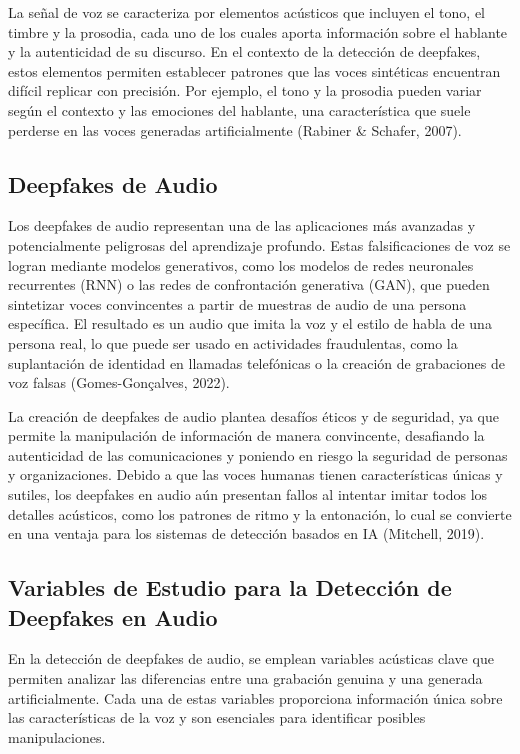 La señal de voz se caracteriza por elementos acústicos que incluyen el tono, el timbre y la prosodia, cada uno de los cuales aporta información sobre el hablante y la autenticidad de su discurso. En el contexto de la detección de deepfakes, estos elementos permiten establecer patrones que las voces sintéticas encuentran difícil replicar con precisión. Por ejemplo, el tono y la prosodia pueden variar según el contexto y las emociones del hablante, una característica que suele perderse en las voces generadas artificialmente (Rabiner \& Schafer, 2007).

\subsection{Deepfakes de Audio}

Los deepfakes de audio representan una de las aplicaciones más avanzadas y potencialmente peligrosas del aprendizaje profundo. Estas falsificaciones de voz se logran mediante modelos generativos, como los modelos de redes neuronales recurrentes (RNN) o las redes de confrontación generativa (GAN), que pueden sintetizar voces convincentes a partir de muestras de audio de una persona específica. El resultado es un audio que imita la voz y el estilo de habla de una persona real, lo que puede ser usado en actividades fraudulentas, como la suplantación de identidad en llamadas telefónicas o la creación de grabaciones de voz falsas (Gomes-Gonçalves, 2022).

La creación de deepfakes de audio plantea desafíos éticos y de seguridad, ya que permite la manipulación de información de manera convincente, desafiando la autenticidad de las comunicaciones y poniendo en riesgo la seguridad de personas y organizaciones. Debido a que las voces humanas tienen características únicas y sutiles, los deepfakes en audio aún presentan fallos al intentar imitar todos los detalles acústicos, como los patrones de ritmo y la entonación, lo cual se convierte en una ventaja para los sistemas de detección basados en IA (Mitchell, 2019).

\subsection{Variables de Estudio para la Detección de Deepfakes en Audio}
En la detección de deepfakes de audio, se emplean variables acústicas clave que permiten analizar las diferencias entre una grabación genuina y una generada artificialmente. Cada una de estas variables proporciona información única sobre las características de la voz y son esenciales para identificar posibles manipulaciones.

